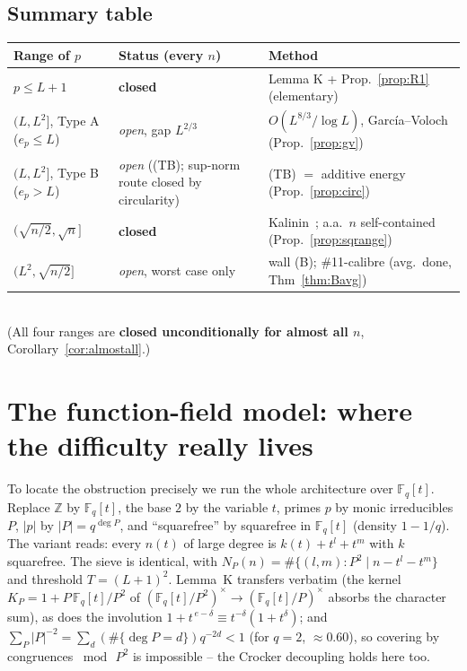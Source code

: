 \documentclass[11pt]{article}
\theoremstyle{plain}
\theoremstyle{definition}
\theoremstyle{remark}
\newcommand{\Z}{\mathbb{Z}}
\newcommand{\F}{\mathbb{F}}
\newcommand{\ep}{e_p}
\begin{document}
\subsection{Summary table}

\begin{center}
\begin{tabular}{lll}
\toprule
Range of $p$ & Status (every $n$) & Method\\
\midrule
$p\le L+1$ & \textbf{closed} & Lemma K + Prop.~\ref{prop:R1} (elementary)\\
$(L,L^2]$, Type A ($\ep\le L$) & \emph{open}, gap $L^{2/3}$ & $O(L^{8/3}/\log L)$, García--Voloch (Prop.~\ref{prop:gv})\\
$(L,L^2]$, Type B ($\ep>L$) & \emph{open} ((TB); sup-norm route closed by circularity) & (TB) $=$ additive energy (Prop.~\ref{prop:circ})\\
$(\sqrt{n/2},\sqrt n]$ & \textbf{closed} & Kalinin~\cite{Kalinin2026}; a.a.\ $n$ self-contained (Prop.~\ref{prop:sqrange})\\
$(L^2,\sqrt{n/2}]$ & \emph{open}, worst case only & wall (B); \#11-calibre (avg.\ done, Thm~\ref{thm:Bavg})\\
\bottomrule
\end{tabular}\\[2pt]
(All four ranges are \textbf{closed unconditionally for almost all $n$},
Corollary~\ref{cor:almostall}.)
\end{center}

\section{The function-field model: where the difficulty really lives}\label{sec:ff}

To locate the obstruction precisely we run the whole architecture over
$\F_q[t]$. Replace $\Z$ by $\F_q[t]$, the base $2$ by the variable $t$,
primes $p$ by monic irreducibles $P$, $|p|$ by $|P|=q^{\deg P}$, and
``squarefree'' by squarefree in $\F_q[t]$ (density $1-1/q$). The variant reads:
every $n(t)$ of large degree is $k(t)+t^l+t^m$ with $k$ squarefree. The sieve is
identical, with $N_P(n)=\#\{(l,m):P^2\mid n-t^l-t^m\}$ and threshold
$T=(L+1)^2$. Lemma~K transfers verbatim (the kernel $K_P=1+P\,\F_q[t]/P^2$ of
$(\F_q[t]/P^2)^\times\to(\F_q[t]/P)^\times$ absorbs the character sum), as does
the involution $1+t^{\,e-\delta}\equiv t^{-\delta}(1+t^\delta)$; and
$\sum_P|P|^{-2}=\sum_d(\#\{\deg P=d\})q^{-2d}<1$ (for $q=2$, $\approx0.60$), so
covering by congruences $\bmod\,P^2$ is impossible -- the Crocker decoupling
holds here too.
\end{document}
